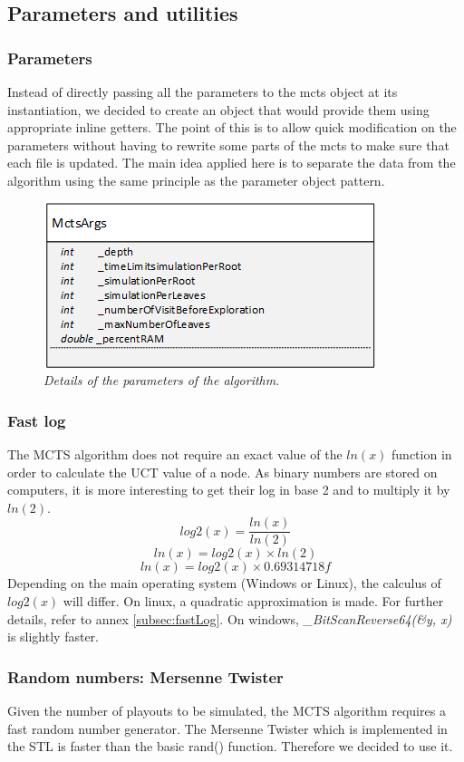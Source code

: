 \newpage
\subsection{Parameters and utilities}
\subsubsection{Parameters}
Instead of directly passing all the parameters to the mcts object at its instantiation, we decided to create an object that would provide them using appropriate inline getters. The point of this is to allow quick modification on the parameters without having to rewrite some parts of the mcts to make sure that each file is updated. The main idea applied here is to separate the data from the algorithm using the same principle as the parameter object pattern.
\begin{figure}[H] 
\centerline{\includegraphics[scale=0.8]{Data_Structure/Img/MctsArgs.png}}
\caption{\label{fig:mctsargsuml}\textit{Details of the parameters of the algorithm}.}
\end{figure}

\subsubsection{Fast log}
The MCTS algorithm does not require an exact value of the \ensuremath{ln(x)} function in order to calculate the UCT value of a node. As binary numbers are stored on computers, it is more interesting to get their log in base 2 and to multiply it by \ensuremath{ln(2)}. 
\begin{equation}
log2(x) = \frac{ln(x)}{ln(2)}
\end{equation}
\begin{equation}
ln(x) = log2(x) \times ln(2)
\end{equation}
\begin{equation}
ln(x) = log2(x) \times 0.69314718f
\end{equation}
Depending on the main operating system (Windows or Linux), the calculus of \ensuremath{log2(x)} will differ. On linux, a quadratic approximation is made. For further details, refer to annex \ref{subsec:fastLog}. On windows, \textit{\_BitScanReverse64(\&y, x)} is slightly faster. 

\subsubsection{Random numbers: Mersenne Twister}
Given the number of playouts to be simulated, the MCTS algorithm requires a fast random number generator. The Mersenne Twister which is implemented in the STL is faster than the basic rand() function. Therefore we decided to use it.


